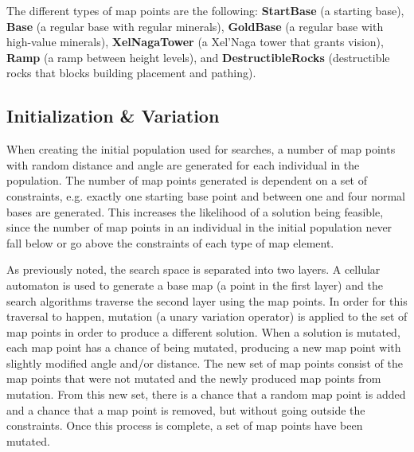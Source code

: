 The different types of map points are the following: \textbf{StartBase} (a starting base), \textbf{Base} (a regular base with regular minerals), \textbf{GoldBase} (a regular base with high-value minerals), \textbf{XelNagaTower} (a Xel'Naga tower that grants vision), \textbf{Ramp} (a ramp between height levels), and \textbf{DestructibleRocks} (destructible rocks that blocks building placement and pathing).

\subsection{Initialization \& Variation}
\label{methodology_genotype_initialization}
When creating the initial population used for searches, a number of map points with random distance and angle are generated for each individual in the population. The number of map points generated is dependent on a set of constraints, e.g. exactly one starting base point and between one and four normal bases are generated. This increases the likelihood of a solution being feasible, since the number of map points in an individual in the initial population never fall below or go above the constraints of each type of map element.

As previously noted, the search space is separated into two layers. A cellular automaton is used to generate a base map (a point in the first layer) and the search algorithms traverse the second layer using the map points. In order for this traversal to happen, mutation (a unary variation operator) is applied to the set of map points in order to produce a different solution. When a solution is mutated, each map point has a chance of being mutated, producing a new map point with slightly modified angle and/or distance. The new set of map points consist of the map points that were not mutated and the newly produced map points from mutation. From this new set, there is a chance that a random map point is added and a chance that a map point is removed, but without going outside the constraints. Once this process is complete, a set of map points have been mutated.